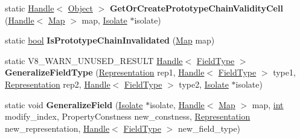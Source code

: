 \begin{DoxyCompactItemize}
\item 
\mbox{\label{classv8_1_1internal_1_1Map_abcc5206ad63b73939a75853537a78df4}} 
static \mbox{\hyperlink{classv8_1_1internal_1_1Handle}{Handle}}$<$ \mbox{\hyperlink{classv8_1_1internal_1_1Object}{Object}} $>$ {\bfseries Get\+Or\+Create\+Prototype\+Chain\+Validity\+Cell} (\mbox{\hyperlink{classv8_1_1internal_1_1Handle}{Handle}}$<$ \mbox{\hyperlink{classv8_1_1internal_1_1Map}{Map}} $>$ map, \mbox{\hyperlink{classv8_1_1internal_1_1Isolate}{Isolate}} $\ast$isolate)
\item 
\mbox{\label{classv8_1_1internal_1_1Map_ac6cfc678279c000be1b26e61f4b51936}} 
static \mbox{\hyperlink{classbool}{bool}} {\bfseries Is\+Prototype\+Chain\+Invalidated} (\mbox{\hyperlink{classv8_1_1internal_1_1Map}{Map}} map)
\item 
\mbox{\label{classv8_1_1internal_1_1Map_ab2e7d01d3a623864d5e49a316eaeb904}} 
static V8\+\_\+\+W\+A\+R\+N\+\_\+\+U\+N\+U\+S\+E\+D\+\_\+\+R\+E\+S\+U\+LT \mbox{\hyperlink{classv8_1_1internal_1_1Handle}{Handle}}$<$ \mbox{\hyperlink{classv8_1_1internal_1_1FieldType}{Field\+Type}} $>$ {\bfseries Generalize\+Field\+Type} (\mbox{\hyperlink{classv8_1_1internal_1_1Representation}{Representation}} rep1, \mbox{\hyperlink{classv8_1_1internal_1_1Handle}{Handle}}$<$ \mbox{\hyperlink{classv8_1_1internal_1_1FieldType}{Field\+Type}} $>$ type1, \mbox{\hyperlink{classv8_1_1internal_1_1Representation}{Representation}} rep2, \mbox{\hyperlink{classv8_1_1internal_1_1Handle}{Handle}}$<$ \mbox{\hyperlink{classv8_1_1internal_1_1FieldType}{Field\+Type}} $>$ type2, \mbox{\hyperlink{classv8_1_1internal_1_1Isolate}{Isolate}} $\ast$isolate)
\item 
\mbox{\label{classv8_1_1internal_1_1Map_a0b105b832248a683c1d34377c06276b2}} 
static void {\bfseries Generalize\+Field} (\mbox{\hyperlink{classv8_1_1internal_1_1Isolate}{Isolate}} $\ast$isolate, \mbox{\hyperlink{classv8_1_1internal_1_1Handle}{Handle}}$<$ \mbox{\hyperlink{classv8_1_1internal_1_1Map}{Map}} $>$ map, \mbox{\hyperlink{classint}{int}} modify\+\_\+index, Property\+Constness new\+\_\+constness, \mbox{\hyperlink{classv8_1_1internal_1_1Representation}{Representation}} new\+\_\+representation, \mbox{\hyperlink{classv8_1_1internal_1_1Handle}{Handle}}$<$ \mbox{\hyperlink{classv8_1_1internal_1_1FieldType}{Field\+Type}} $>$ new\+\_\+field\+\_\+type)

\end{DoxyCompactItemize}
